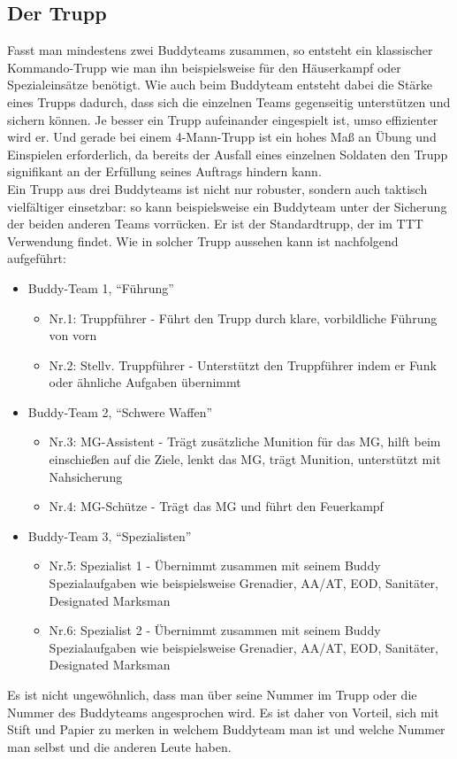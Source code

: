 \subsection{Der Trupp}
Fasst man mindestens zwei Buddyteams zusammen, so entsteht ein klassischer Kommando-Trupp wie man ihn beispielsweise für den Häuserkampf oder Spezialeinsätze benötigt. Wie auch beim Buddyteam entsteht dabei die Stärke eines Trupps dadurch, dass sich die einzelnen Teams gegenseitig unterstützen und sichern können. Je besser ein Trupp aufeinander eingespielt ist, umso effizienter wird er. Und gerade bei einem 4-Mann-Trupp ist ein hohes Maß an Übung und Einspielen erforderlich, da bereits der Ausfall eines einzelnen Soldaten den Trupp signifikant an der Erfüllung seines Auftrags hindern kann.
\\Ein Trupp aus drei Buddyteams ist nicht nur robuster, sondern auch taktisch vielfältiger einsetzbar: so kann beispielsweise ein Buddyteam unter der Sicherung der beiden anderen Teams vorrücken. Er ist der Standardtrupp, der im \ac{TTT} Verwendung findet. Wie in solcher Trupp aussehen kann ist nachfolgend aufgeführt:
\begin{itemize}
	\item Buddy-Team 1, “Führung” 
	\begin{itemize}	
		\item Nr.1: Truppführer -  Führt den Trupp durch klare, vorbildliche Führung von vorn
		\item Nr.2: Stellv. Truppführer - Unterstützt den Truppführer indem er Funk oder ähnliche Aufgaben übernimmt
	\end{itemize}
\end{itemize}
\begin{itemize}
	\item Buddy-Team 2, “Schwere Waffen” 
	\begin{itemize}
		\item Nr.3: MG-Assistent - Trägt zusätzliche Munition für das MG, hilft beim einschießen auf die Ziele, lenkt das MG, trägt Munition, unterstützt mit Nahsicherung
		\item Nr.4: MG-Schütze - Trägt das MG und führt den Feuerkampf
	\end{itemize}
\end{itemize}
\begin{itemize}
	\item Buddy-Team 3, “Spezialisten” 
	\begin{itemize} 
		\item Nr.5: Spezialist 1 - Übernimmt zusammen mit seinem Buddy Spezialaufgaben wie beispielsweise Grenadier, \ac{AA}/\ac{AT}, \ac{EOD}, Sanitäter, Designated Marksman
		\item Nr.6: Spezialist 2 - Übernimmt zusammen mit seinem Buddy Spezialaufgaben wie beispielsweise Grenadier, \ac{AA}/\ac{AT}, \ac{EOD}, Sanitäter, Designated Marksman
	\end{itemize}
\end{itemize}
Es ist nicht ungewöhnlich, dass man über seine Nummer im Trupp oder die Nummer des Buddyteams angesprochen wird. Es ist daher von Vorteil, sich mit Stift und Papier zu merken in welchem Buddyteam man ist und welche Nummer man selbst und die anderen Leute haben.